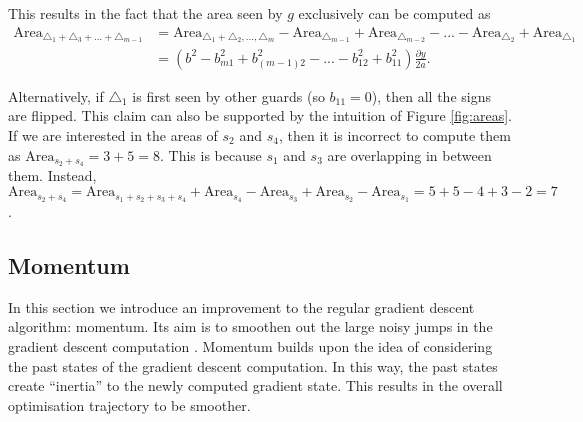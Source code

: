 
This results in the fact that the area seen by $g$ exclusively can be computed as 
\begin{align*}
    \text{Area}_{\triangle_1 + \triangle_3 + ... + \triangle_{m - 1}} &= \text{Area}_{\triangle_1 + \triangle_2, ..., \triangle_m} - \text{Area}_{\triangle_{m - 1}} + \text{Area}_{\triangle_{m - 2}} - ... - \text{Area}_{\triangle_2} + \text{Area}_{\triangle_1} \\
                                                                      &= \left(b^2 - b_{m1}^2 + b_{(m - 1)2}^2 - ... - b_{12}^2 + b_{11}^2\right)\frac{\partial y}{2a}.
\end{align*}

Alternatively, if $\triangle_1$ is first seen by other guards (so $b_{11} = 0$), then all the signs are flipped. This claim can also be supported by the intuition of Figure \ref{fig:areas}. If we are interested in the areas of $s_2$ and $s_4$, then it is incorrect to compute them as $\text{Area}_{s_2 + s_4} = 3 + 5 = 8$. This is because $s_1$ and $s_3$ are overlapping in between them.  Instead, $\text{Area}_{s_2 + s_4} = \text{Area}_{s_1 + s_2 + s_3 + s_4} + \text{Area}_{s_4} - \text{Area}_{s_3} + \text{Area}_{s_2} - \text{Area}_{s_1} = 5 + 5 - 4 + 3 - 2 = 7$.

\subsection{Momentum}

In this section we introduce an improvement to the regular gradient descent algorithm: momentum. Its aim is to smoothen out the large noisy jumps in the gradient descent computation \cite{goodfelow2016deep}. Momentum builds upon the idea of considering the past states of the gradient descent computation. In this way, the past states create ``inertia'' to the newly computed gradient state. This results in the overall optimisation trajectory to be smoother.

